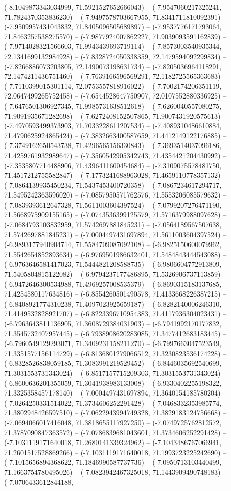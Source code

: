 (-8.1049873343034999, 71.5921527652666043) -- (-7.9547060217325241, 71.7824370353836230) -- (-7.9497578703667955, 71.8341711810092391) -- (-7.9509957431043832, 71.8405096505689897) -- (-7.9537776171793064, 71.8463257538275570) -- (-7.9877924007862227, 71.9039093591162839) -- (-7.9714028321566603, 71.9943439693719114) -- (-7.8573003540935344, 72.1341699132984928) -- (-7.8328724050338359, 72.1479594092299834) -- (-7.8266886073203805, 72.1490073198631734) -- (-7.8205036964118291, 72.1474211436751460) -- (-7.7639166596569291, 72.1182725565363683) -- (-7.7110399015301114, 72.0753557818916022) -- (-7.7002174206351119, 72.0647499265752458) -- (-7.6544528647750907, 72.0107552880336925) -- (-7.6476501306927345, 71.9985731638512618) -- (-7.6260040557080275, 71.9091935671282698) -- (-7.6272408152507865, 71.9007431920575613) -- (-7.4970593499373903, 71.7033228611207534) -- (-7.4089310486610884, 71.4790625924865424) -- (-7.3832663400587659, 71.4412149122176885) -- (-7.3749162650543738, 71.4296565156330843) -- (-7.3693514037096186, 71.4259761932989647) -- (-7.3560542905342743, 71.4354421204430992) -- (-7.3535807714488906, 71.4396411600454684) -- (-7.3109075578481750, 71.4517212755582847) -- (-7.1773241688963028, 71.4659110778357132) -- (-7.0864139935450234, 71.5437453400720358) -- (-7.0867234617294717, 71.5495242363596020) -- (-7.0857950571762576, 71.5553206085579632) -- (-7.0839393612647328, 71.5611003604397524) -- (-7.0799207276471190, 71.5668975909155165) -- (-7.0743536399125579, 71.5716379988097628) -- (-7.0684793103832959, 71.5742697881845231) -- (-7.0564189567507638, 71.5742697881845231) -- (-7.0004497431697894, 71.5611003604397524) -- (-6.9893177940904714, 71.5584709087092108) -- (-6.9825150600079962, 71.5542654852893634) -- (-6.9769501986632401, 71.5484843444543088) -- (-6.9763646581417023, 71.5444821208588735) -- (-6.9806604772913809, 71.5405804815122082) -- (-6.9794237177486895, 71.5326906737113859) -- (-6.9472646300534988, 71.4969257008535379) -- (-6.8690315183137685, 71.4254580117634816) -- (-6.8554260501490578, 71.4133668226387215) -- (-6.8408921774310238, 71.4097023925659187) -- (-6.8282140006246310, 71.4149532828921707) -- (-6.8223396710954383, 71.4117936304023431) -- (-6.7963643811136905, 71.3608729384031903) -- (-6.7941992170177832, 71.3545732407957445) -- (-6.7938908620283085, 71.3477412683183445) -- (-6.7960549129293071, 71.3409231158211270) -- (-6.7997663047523549, 71.3351577156114729) -- (-6.8136801279066512, 71.3230823536174228) -- (-6.8328526838059185, 71.3083991219529452) -- (-6.8446035692540699, 71.3031553731343024) -- (-6.8517157715209303, 71.3031553731343024) -- (-6.8600636201355059, 71.3041938983133008) -- (-6.9330402255198322, 71.3325358457178140) -- (-7.0004497431697894, 71.3640154185780204) -- (-7.0264250331514022, 71.3734606252291428) -- (-7.0468332353985774, 71.3802948426597510) -- (-7.0622943994749328, 71.3829183124756668) -- (-7.0694066017416048, 71.3818655117927250) -- (-7.0749725762812572, 71.3787090847363572) -- (-7.0786839681043601, 71.3734606252291428) -- (-7.1031119171640018, 71.2680141339324962) -- (-7.1043486767066941, 71.2601517528869266) -- (-7.1031119171640018, 71.1993723225242690) -- (-7.1015656894368622, 71.1846990587737736) -- (-7.0950713103440499, 71.1663754780495026) -- (-7.0823942467325018, 71.1443909490748183) -- (-7.0706433612844188, 